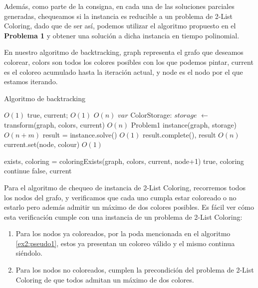 \documentclass{article}
\theoremstyle{definition}
\theoremstyle{remark}
\begin{document}
Además, como parte de la consigna, en cada una de las soluciones parciales generadas, chequeamos si la instancia es reducible a un problema de 2-List Coloring, dado que de ser así, podemos utilizar el algoritmo propuesto en el \textbf{Problema 1} y obtener una solución a dicha instancia en tiempo polinomial. 

En nuestro algoritmo de backtracking, graph representa el grafo que deseamos colorear, colors son todos los colores posibles con los que podemos pintar, current es el coloreo acumulado hasta la iteración actual, y node es el nodo por el que estamos iterando.

\begin{algorithm}
\caption{Algoritmo de backtracking}
\label{ex2:pseudo1}

\begin{algorithmic}
 \Comment $O(1)$
    \State \Return true, current; \Comment $O(1)$
\Else
     \Comment $O(n)$
        \State $var$ ColorStorage: $storage$ $\gets$ transform(graph, colors, current) \Comment $O(n)$
        \State Problem1 instance(graph, storage) \Comment $O(n+m)$
        \State result = instance.solve() \Comment $O(1)$ %
        \State \Return result.complete(), result
    \EndIf
         \Comment $O(n)$
            \State current.set(node, colour) \Comment $O(1)$

            \State exists, coloring = coloringExists(graph, colors, current, node+1)
                \State \Return true, coloring
            \Else 
                \State continue
            \EndIf    
        \EndIf
    \EndFor
    \State \Return false, current
\EndIf
\EndFunction
\end{algorithmic}
\end{algorithm}


Para el algoritmo de chequeo de instancia de 2-List Coloring, recorremos todos los nodos del grafo, y verificamos que cada uno cumpla estar coloreado o no estarlo pero además admitir un máximo de dos colores posibles. Es fácil ver cómo esta verificación cumple con una instancia de un problema de 2-List Coloring: 
\begin{enumerate}
\item Para los nodos ya coloreados, por la poda mencionada en el algoritmo \ref{ex2:pseudo1}, estos ya presentan un coloreo válido y el mismo continua siéndolo.
\item Para los nodos no coloreados, cumplen la precondición del problema de 2-List Coloring de que todos admitan un máximo de dos colores.
\end{enumerate}
\end{document}
